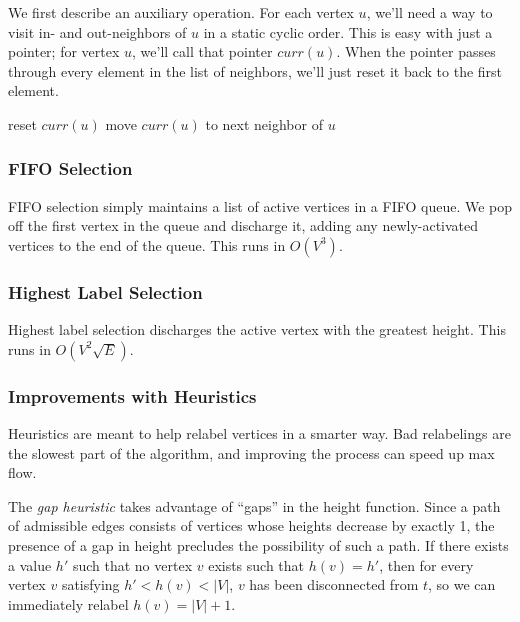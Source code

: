 We first describe an auxiliary operation. For each vertex $u$, we'll need a way to visit in- and out-neighbors of $u$ in a static cyclic order. This is easy with just a pointer; for vertex $u$, we'll call that pointer $curr(u)$. When the pointer passes through every element in the list of neighbors, we'll just reset it back to the first element.

\noindent \begin{minipage}{\textwidth}
\begin{algorithmic}
			\State {}
			\State reset $curr(u)$
		\Else
				\State {}
			\Else
				\State move $curr(u)$ to next neighbor of $u$
			\EndIf
		\EndIf
	\EndWhile
\EndFunction
\end{algorithmic}
\end{minipage}

\subsubsection{FIFO Selection}

FIFO selection simply maintains a list of active vertices in a FIFO queue. We pop off the first vertex in the queue and discharge it, adding any newly-activated vertices to the end of the queue. This runs in $O(V^3)$.

\subsubsection{Highest Label Selection}

Highest label selection discharges the active vertex with the greatest height. This runs in $O(V^2\sqrt{E})$.

\subsubsection{Improvements with Heuristics}

Heuristics are meant to help relabel vertices in a smarter way. Bad relabelings are the slowest part of the algorithm, and improving the process can speed up max flow.

The \textit{gap heuristic} takes advantage of ``gaps'' in the height function. Since a path of admissible edges consists of vertices whose heights decrease by exactly 1, the presence of a gap in height precludes the possibility of such a path. If there exists a value $h'$ such that no vertex $v$ exists such that $h(v)=h'$, then for every vertex $v$ satisfying $h' < h(v) < |V|$, $v$ has been disconnected from $t$, so we can immediately relabel $h(v)=|V| + 1$.

